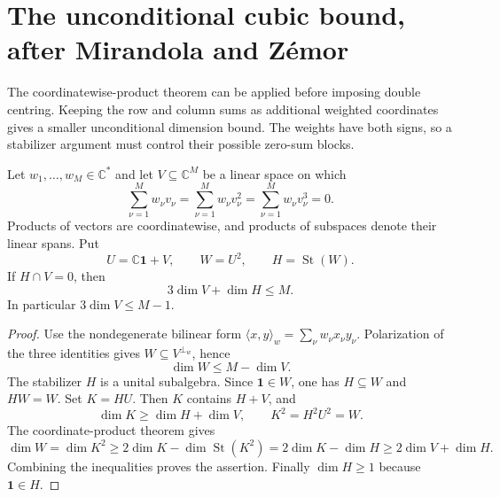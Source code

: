 \section{The unconditional cubic bound, after Mirandola and Z\'emor}
The coordinatewise-product theorem can be applied before imposing double centring. Keeping the row and column sums as additional weighted coordinates gives a smaller unconditional dimension bound. The weights have both signs, so a stabilizer argument must control their possible zero-sum blocks.

\begin{lemma}
\label{lem:weighted-moment-stabilizer}
Let $w_1,\ldots,w_M\in\mathbb C^*$ and let $V\subseteq\mathbb C^M$
be a linear space on which
\[
 \sum_{\nu=1}^M w_\nu v_\nu
 =\sum_{\nu=1}^M w_\nu v_\nu^2
 =\sum_{\nu=1}^M w_\nu v_\nu^3=0.
\]
Products of vectors are coordinatewise, and products of subspaces
denote their linear spans. Put
\[
 U=\mathbb C\mathbf1+V,\qquad
 W=U^2,\qquad H=\operatorname{St}(W).
\]
If $H\cap V=0$, then
\[
 3\dim V+\dim H\le M.
\]
In particular $3\dim V\le M-1$.
\end{lemma}
\begin{proof}
Use the nondegenerate bilinear form
$\langle x,y\rangle_w=\sum_\nu w_\nu x_\nu y_\nu$.
Polarization of the three identities gives
$W\subseteq V^{\perp_w}$, hence
\[
 \dim W\le M-\dim V.
\]
The stabilizer $H$ is a unital subalgebra. Since $\mathbf1\in W$,
one has $H\subseteq W$ and $HW=W$.
Set $K=HU$. Then $K$ contains $H+V$, and
\[
 \dim K\ge\dim H+\dim V,\qquad K^2=H^2U^2=W.
\]
The coordinate-product theorem
\citep[Theorem~3.3, p.~7]{MZ} gives
\[
 \dim W=\dim K^2
 \ge2\dim K-\dim\operatorname{St}(K^2)
 =2\dim K-\dim H
 \ge2\dim V+\dim H.
\]
Combining the inequalities proves the assertion. Finally
$\dim H\ge1$ because $\mathbf1\in H$.
\end{proof}

